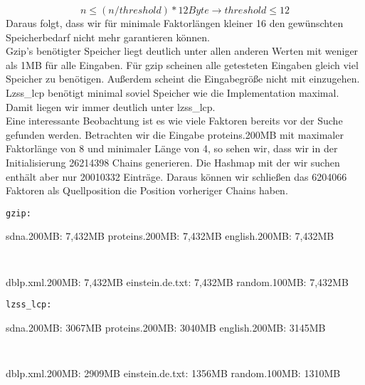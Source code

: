 \begin{equation}\nonumber
	n\leq(n/threshold) * 12Byte \rightarrow threshold\leq12
\end{equation}
Daraus folgt, dass wir für minimale Faktorlängen kleiner 16 den gewünschten Speicherbedarf nicht mehr garantieren können.\\
Gzip's benötigter Speicher liegt deutlich unter allen anderen Werten mit weniger als 1MB für alle Eingaben. Für gzip scheinen  alle getesteten Eingaben gleich viel Speicher zu benötigen. Außerdem scheint die Eingabegröße nicht mit einzugehen.\\
Lzss\_lcp benötigt  minimal soviel Speicher wie die Implementation maximal. Damit liegen wir immer deutlich unter lzss\_lcp.\\
Eine interessante Beobachtung ist es wie viele Faktoren bereits vor der Suche gefunden werden.
Betrachten wir die Eingabe proteins.200MB mit maximaler Faktorlänge von 8 und minimaler Länge von 4, so sehen wir, dass wir in der Initialisierung 26214398 Chains generieren. Die Hashmap mit der wir suchen enthält aber nur 20010332 Einträge. Daraus können wir schließen das 6204066 Faktoren als Quellposition  die Position vorheriger Chains haben.




\begin{multicols}{2}
	\texttt{gzip:}
	\begin{outline}
		\1[]
		\2[] sdna.200MB:  7,432MB
		\2[] proteins.200MB: 7,432MB
		\2[] english.200MB: 7,432MB
	\end{outline}
	\columnbreak
		\texttt{  }
	\begin{outline}
		\1[]
			\2[] dblp.xml.200MB: 7,432MB
		\2[] einstein.de.txt: 7,432MB
		\2[] random.100MB: 7,432MB
	
	\end{outline}
\end{multicols}

\begin{multicols}{2}
	\texttt{lzss\_lcp:}
	\begin{outline}
		\1[]
		\2[] sdna.200MB:  3067MB
		\2[] proteins.200MB: 3040MB
		\2[] english.200MB: 3145MB
	\end{outline}
	\columnbreak
	\texttt{  }
	\begin{outline}
		\1[]
			\2[] dblp.xml.200MB: 2909MB
		\2[] einstein.de.txt: 1356MB
		\2[] random.100MB: 1310MB
	
	\end{outline}
\end{multicols}

